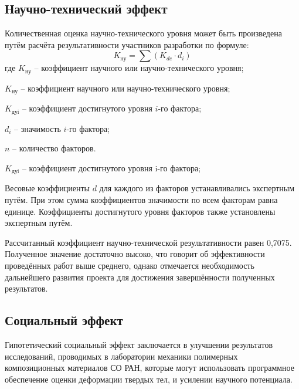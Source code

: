 \subsection{Научно-технический эффект}
Количественная оценка научно-технического уровня может быть произведена путём расчёта результативности участников разработки по формуле:
\begin{equation}
K_{\text{ну}}=\sum (K_{de} \cdot d_i)
\end{equation}
где $K_\text{ну}$ – коэффициент научного или научно-технического уровня;

$K_\text{ну}$ – коэффициент научного или научно-технического уровня;

$K_\text{дуi}$ – коэффициент достигнутого уровня $i$-го фактора;

$d_i$ – значимость $i$-го фактора;

$n$ – количество факторов.

$K_\text{дуi}$ – коэффициент достигнутого уровня $\text{i}$-го фактора;

Весовые коэффициенты $d$ для каждого из факторов устанавливались экспертным путём. При этом сумма коэффициентов значимости по всем факторам равна единице. Коэффициенты достигнутого уровня факторов также установлены экспертным путём.

Рассчитанный коэффициент научно-технической результативности равен 0,7075. Полученное значение достаточно высоко, что говорит об эффективности проведённых работ выше среднего, однако отмечается необходимость дальнейшего развития проекта для достижения завершённости полученных результатов.

\subsection{Социальный эффект}

Гипотетический социальный эффект заключается в улучшении результатов исследований, проводимых в лаборатории механики полимерных композиционных материалов СО РАН, которые могут использовать программное обеспечение оценки деформации твердых тел, и усилении научного потенциала.